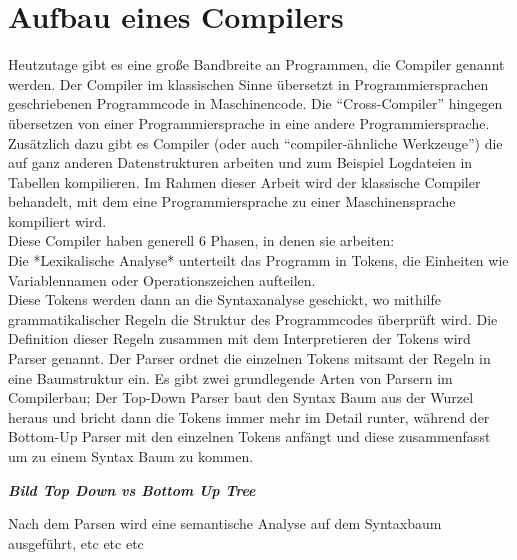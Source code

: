 \section{Aufbau eines Compilers}

Heutzutage gibt es eine große Bandbreite an Programmen, die Compiler genannt werden.
Der Compiler im klassischen Sinne übersetzt in Programmiersprachen geschriebenen Programmcode in Maschinencode.
Die ``Cross-Compiler'' hingegen übersetzen von einer Programmiersprache in eine andere Programmiersprache.
Zusätzlich dazu gibt es Compiler (oder auch ``compiler-ähnliche Werkzeuge'') die auf ganz anderen Datenstrukturen arbeiten und zum Beispiel Logdateien in Tabellen kompilieren\cite{mossenbock:2024}.
Im Rahmen dieser Arbeit wird der klassische Compiler behandelt, mit dem eine Programmiersprache zu einer Maschinensprache kompiliert wird.\\
Diese Compiler haben generell 6 Phasen, in denen sie arbeiten:\\
Die *Lexikalische Analyse* unterteilt das Programm in Tokens, die Einheiten wie Variablennamen oder Operationszeichen aufteilen.\\
Diese Tokens werden dann an die Syntaxanalyse geschickt, wo mithilfe grammatikalischer Regeln die Struktur des Programmcodes überprüft wird.
Die Definition dieser Regeln zusammen mit dem Interpretieren der Tokens wird Parser genannt.
Der Parser ordnet die einzelnen Tokens mitsamt der Regeln in eine Baumstruktur ein.
Es gibt zwei grundlegende Arten von Parsern im Compilerbau;
Der Top-Down Parser baut den Syntax Baum aus der Wurzel heraus und bricht dann die Tokens immer mehr im Detail runter, während der Bottom-Up Parser mit den einzelnen Tokens anfängt und diese zusammenfasst um zu einem Syntax Baum zu kommen\cite{meduna2007elements}.

\textbf{\textit{Bild Top Down vs Bottom Up Tree}}

Nach dem Parsen wird eine semantische Analyse auf dem Syntaxbaum ausgeführt, etc etc etc
